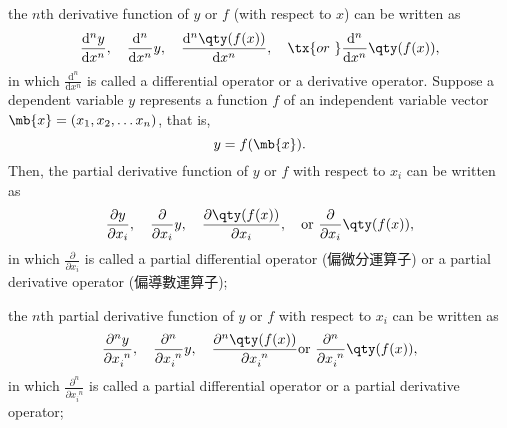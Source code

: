 \documentclass[a4paper,12pt]{report}
\begin{document}
\begin{itemize}
\begin{itemize}
the $n$th derivative function of $y$ or $f$ (with respect to $x$) can be written as
\[\frac{\mathrm{d}^ny}{\mathrm{d}x^n},\quad\frac{\mathrm{d}^n}{\mathrm{d}x^n}y,\quad\frac{\mathrm{d}^n\qty(f(x))}{\mathrm{d}x^n},\quad\tx{or\ }\frac{\mathrm{d}^n}{\mathrm{d}x^n}\qty(f(x)),\]
in which $\frac{\mathrm{d}^n}{\mathrm{d}x^n}$ is called a differential operator or a derivative operator.
Suppose a dependent variable $y$ represents a function $f$ of an independent variable vector $\mb{x}=(x_1,x_2,\dots x_n)$, that is,
\[y=f(\mb{x}).\]
Then, the partial derivative function of $y$ or $f$ with respect to $x_i$ can be written as
\[\frac{\partial y}{\partial x_i},\quad\frac{\partial }{\partial x_i}y,\quad\frac{\partial \qty(f(x))}{\partial x_i},\quad\text{or\ }\frac{\partial }{\partial x_i}\qty(f(x)),\]
in which $\frac{\partial}{\partial x_i}$ is called a partial differential operator (偏微分運算子) or a partial derivative operator (偏導數運算子);

the $n$th partial derivative function of $y$ or $f$ with respect to $x_i$ can be written as
\[\frac{\partial^ny}{\partial x_i^{\phantom{i}n}},\quad\frac{\partial^n}{\partial x_i^{\phantom{i}n}}y,\quad\frac{\partial^n\qty(f(x))}{\partial x_i^{\phantom{i}n}}\text{or\ }\frac{\partial^n}{\partial x_i^{\phantom{i}n}}\qty(f(x)),\]
in which $\frac{\partial^n}{\partial x_i^{\phantom{i}n}}$ is called a partial differential operator or a partial derivative operator;


\end{itemize}
\end{itemize}
\end{document}
